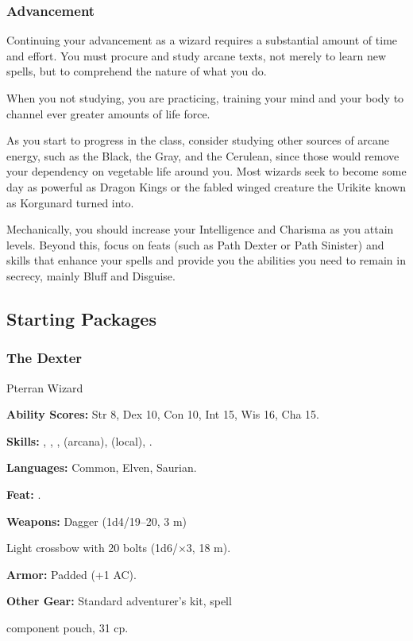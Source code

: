 \subsubsection{Advancement}
Continuing your advancement as a wizard requires a substantial amount of time and effort. You must procure and study arcane texts, not merely to learn new spells, but to comprehend the nature of what you do.

When you not studying, you are practicing, training your mind and your body to channel ever greater amounts of life force.

As you start to progress in the class, consider studying other sources of arcane energy, such as the Black, the Gray, and the Cerulean, since those would remove your dependency on vegetable life around you. Most wizards seek to become some day as powerful as Dragon Kings or the fabled winged creature the Urikite known as Korgunard turned into.

Mechanically, you should increase your Intelligence and Charisma as you attain levels. Beyond this, focus on feats (such as Path Dexter or Path Sinister) and skills that enhance your spells and provide you the abilities you need to remain in secrecy, mainly Bluff and Disguise.

\subsection{Starting Packages}
\subsubsection{The Dexter}
Pterran Wizard

\textbf{Ability Scores:} Str 8, Dex 10, Con 10, Int 15, Wis 16, Cha 15.

\textbf{Skills:} , , ,  (arcana),  (local), .

\textbf{Languages:} Common, Elven, Saurian.

\textbf{Feat:} .

\textbf{Weapons:} Dagger (1d4/19--20, 3 m)

Light crossbow with 20 bolts (1d6/$\times$3, 18 m).

\textbf{Armor:} Padded (+1 AC).

\textbf{Other Gear:} Standard adventurer's kit, spell

component pouch, 31 cp.

